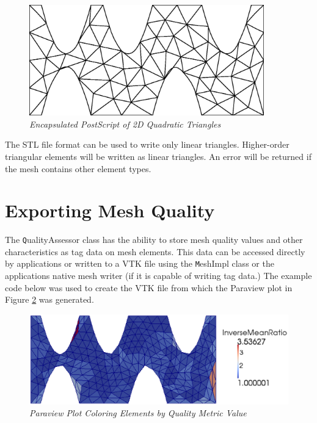 \begin{figure}[htb!]
\begin{center}
\includegraphics[width=4in]{mesh}
\caption{\em Encapsulated PostScript of 2D Quadratic Triangles \label{fig:mesh}}
\end{center}
\end{figure}

The STL file format can be used to write only linear triangles.  Higher-order triangular elements will be written as linear triangles.  An error will be returned if the mesh contains other element types.

\section{Exporting Mesh Quality}

The {\texttt QualityAssessor} class has the ability to store mesh quality values and other characteristics as tag data on mesh elements.  This data can be accessed directly by applications or written to a VTK file using the {\texttt MeshImpl} class or the applications native mesh writer (if it is capable of writing tag data.)  The example code below was used to create the VTK file from which the Paraview plot in Figure \ref{fig:meshqual} was generated.

\begin{figure}[htb!]
\begin{center}
\includegraphics[width=5in]{meshqual}
\caption{\em Paraview Plot Coloring Elements by Quality Metric Value \label{fig:meshqual}}
\end{center}
\end{figure}

